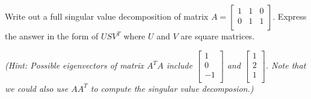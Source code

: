 


Write out a full singular value decomposition of matrix $A = \begin{bmatrix}
    1 & 1 & 0 \\
    0 & 1 & 1 \\
  \end{bmatrix}$. Express the answer in the form of $USV^{T}$ where $U$ and $V$ are square matrices. 

\textit{(Hint: 
Possible eigenvectors of matrix $A^{T}A$ include $\begin{bmatrix}
    1 \\ 0 \\ -1 \\
  \end{bmatrix}$ and $\begin{bmatrix}
    1 \\ 2 \\ 1 \\
  \end{bmatrix}$.  Note that we could also use $AA^{T}$ to compute the singular value decomposion.)}

